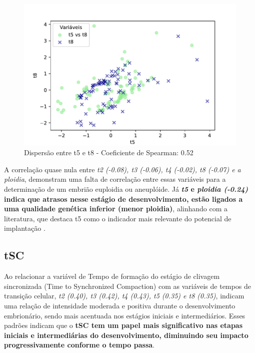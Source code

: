 \begin{figure}[h]
\begin{minipage}[b]{0.45\linewidth}
        \caption{Dispersão entre t5 e t8 - Coeficiente de Spearman: 0.52}
        \label{fig:t5-t8}
        \centering
        \includegraphics[scale=0.48]{figuras/Spearman/t5-t8.pdf}
        \vspace{0.3cm}
        \begin{minipage}{\linewidth}
            \centering
        \end{minipage}
    \end{minipage}
\end{figure}
\FloatBarrier

A correlação quase nula entre \textit{t2 (-0.08), t3 (-0.06), t4 (-0.02), t8 (-0.07) e a ploidia}, demonstram uma falta de correlação entre essas variáveis para a determinação de um embrião euploidia ou aneuplóide. Já \textbf{\textit{t5} e \textit{ploidia (-0.24)} indica que atrasos nesse estágio de desenvolvimento, estão ligados a uma qualidade genética inferior (menor ploidia)}, alinhando com a literatura, que destaca t5 como o indicador mais relevante do potencial de implantação . 

\subsection*{tSC}
Ao relacionar a variável de Tempo de formação do estágio de clivagem sincronizada (Time to Synchronized Compaction) com as variáveis de tempos de transição celular, \textit{t2 (0.40), t3 (0.42), t4 (0.43), t5 (0.35) e t8 (0.35)}, indicam uma relação de intensidade moderada e positiva durante o desenvolvimento embrionário, sendo mais acentuada nos estágios iniciais e intermediários. Esses padrões indicam que o \textbf{tSC tem um papel mais significativo nas etapas iniciais e intermediárias do desenvolvimento, diminuindo seu impacto progressivamente conforme o tempo passa}. 

